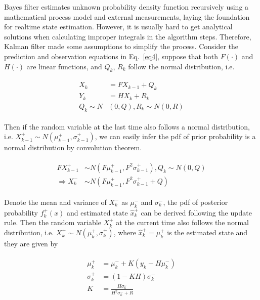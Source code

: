 \documentclass[conference]{IEEEtran}
\begin{document}
	Bayes filter estimates unknown probability density function recursively using a mathematical process model and external measurements, laying the foundation for realtime state estimation. However, it is usually hard to get analytical solutions when calculating improper integrals in the algorithm steps. Therefore, Kalman filter made some assumptions to simplify the process. Consider the prediction and observation equations in Eq.~\ref{eq4}, suppose that both $F(\cdot)$ and $H(\cdot)$ are linear functions, and $Q_{k}$, $R_{k}$ follow the normal distribution, i.e.
	
	\begin{equation}
	\begin{split}
	\begin{aligned}
	X_{k}&=FX_{k-1}+Q_{k}\\
	Y_{k}&=HX_{k}+R_{k}\\
	Q_{k}\sim N&(0,Q), R_{k}\sim N(0,R)
	\label{eq9}
	\end{aligned}
	\end{split}
	\end{equation}
	
	Then if the random variable at the last time also follows a normal distribution, i.e. $X_{k-1}^{+}\sim N(\mu _{k-1}^{+},\sigma  _{k-1}^{+})$, we can easily infer the pdf of prior probability is a normal distribution by convolution theorem.
	
	\begin{equation}
	\begin{split}
	\begin{aligned}
	FX_{k-1}^{+}&\sim N(F\mu _{k-1}^{+},F^{2}\sigma  _{k-1}^{+}), Q_{k}\sim N(0,Q)\\
	\Rightarrow X_{k}^{-}&\sim N(F\mu _{k-1}^{+},F^{2}\sigma  _{k-1}^{+}+Q)
	\label{eq10}
	\end{aligned}
	\end{split}
	\end{equation}
	
	Denote the mean and variance of $X_{k}^{-}$ as $\mu_{k}^{-}$ and $\sigma_{k}^{-}$, the pdf of posterior probability $f_{k}^{+}(x)$ and estimated state $\hat{x}_{k}^{+}$ can be derived following the update rule. Then the random variable $X_{k}^{+}$ at the current time also follows the normal distribution, i.e. $X_{k}^{+} \sim N(\mu_{k}^{+}, \sigma_{k}^{+})$, where $\hat{x}_{k}^{+}=\mu_{k}^{+}$ is the estimated state and they are given by
	
	\begin{equation}
	\begin{split}
	\begin{aligned}
	\mu_{k}^{+}&=\mu_{k}^{-}+K(y_{k}-H\mu_{k}^{-}) \\
	\sigma_{k}^{+}&=(1-KH)\sigma_{k}^{-}\\
	K&=\frac{H\sigma_{k}^{-}}{H^{2}\sigma_{k}^{-}+R}
	\label{eq11}
	\end{aligned}
	\end{split}
	\end{equation}
	
\end{document}
